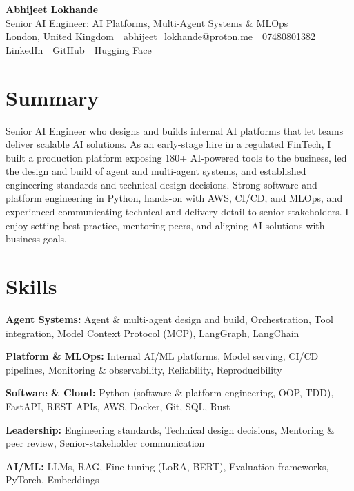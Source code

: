 \documentclass[10pt,a4paper]{article}
\newcommand{\sep}{\,\textcolor{accent!60}{\textbar}\,}
\begin{document}
\begin{center}
  {\fontsize{24}{26}\selectfont\bfseries Abhijeet Lokhande}\\[3pt]
  {\color{accent}\large Senior AI Engineer: AI Platforms, Multi-Agent Systems \& MLOps}\\[5pt]
  {\small
    London, United Kingdom \sep
    \href{mailto:abhijeet_lokhande@proton.me}{abhijeet\_lokhande@proton.me} \sep
    07480801382 \\[2pt]
    \href{https://www.linkedin.com/in/ablds/}{LinkedIn} \sep
    \href{https://github.com/abhijeetscode}{GitHub} \sep
    \href{https://huggingface.co/ab-ai}{Hugging Face}
  }
\end{center}
\vspace{2pt}

\section{Summary}
Senior AI Engineer who designs and builds internal AI platforms that let teams deliver scalable AI solutions. As an early-stage hire in a regulated FinTech, I built a production platform exposing 180+ AI-powered tools to the business, led the design and build of agent and multi-agent systems, and established engineering standards and technical design decisions. Strong software and platform engineering in Python, hands-on with AWS, CI/CD, and MLOps, and experienced communicating technical and delivery detail to senior stakeholders. I enjoy setting best practice, mentoring peers, and aligning AI solutions with business goals.

\section{Skills}
\begin{tight}
  \item[\textcolor{accent}{\small$\bullet$}] \textbf{Agent Systems:} Agent \& multi-agent design and build, Orchestration, Tool integration, Model Context Protocol (MCP), LangGraph, LangChain
  \item[\textcolor{accent}{\small$\bullet$}] \textbf{Platform \& MLOps:} Internal AI/ML platforms, Model serving, CI/CD pipelines, Monitoring \& observability, Reliability, Reproducibility
  \item[\textcolor{accent}{\small$\bullet$}] \textbf{Software \& Cloud:} Python (software \& platform engineering, OOP, TDD), FastAPI, REST APIs, AWS, Docker, Git, SQL, Rust
  \item[\textcolor{accent}{\small$\bullet$}] \textbf{Leadership:} Engineering standards, Technical design decisions, Mentoring \& peer review, Senior-stakeholder communication
  \item[\textcolor{accent}{\small$\bullet$}] \textbf{AI/ML:} LLMs, RAG, Fine-tuning (LoRA, BERT), Evaluation frameworks, PyTorch, Embeddings
\end{tight}
\end{document}
